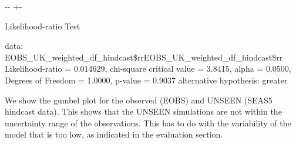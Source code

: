 \documentclass[letterpaper,10pt,english]{sphinxmanual}
\newlength\nbsphinxcodecellspacing
\begin{document}
{

\kern-\sphinxverbatimsmallskipamount\kern-\baselineskip
\kern+\FrameHeightAdjust\kern-\fboxrule
\vspace{\nbsphinxcodecellspacing}

\begin{sphinxVerbatim}[commandchars=\\\{\}]

        Likelihood-ratio Test

data:  EOBS\_UK\_weighted\_df\_hindcast\$rrEOBS\_UK\_weighted\_df\_hindcast\$rr
Likelihood-ratio = 0.014629, chi-square critical value = 3.8415, alpha
= 0.0500, Degrees of Freedom = 1.0000, p-value = 0.9037
alternative hypothesis: greater

\end{sphinxVerbatim}
}

We show the gumbel plot for the observed (EOBS) and UNSEEN (SEAS5 hindcast data). This shows that the UNSEEN simulations are not within the uncertainty range of the observations. This has to do with the variability of the model that is too low, as indicated in the evaluation section.
\end{document}
